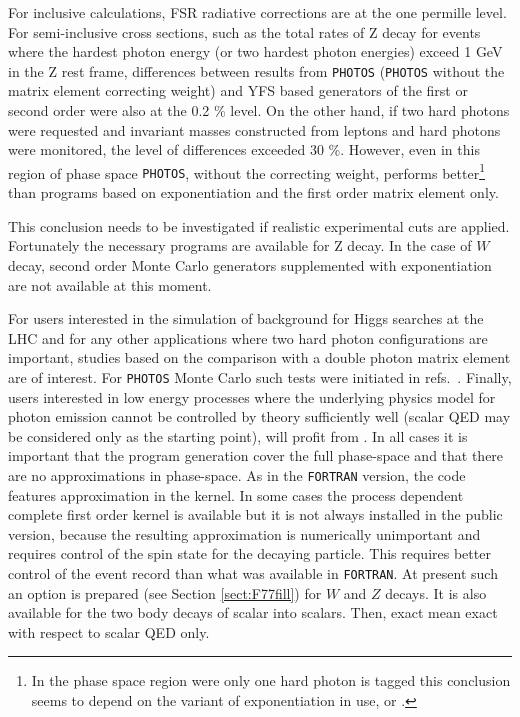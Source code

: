 \documentclass[]{Photos_interface_design}
\begin{document}
For inclusive calculations, FSR radiative corrections are at the one permille level.
For semi-inclusive cross sections, such as the total rates of Z decay for events
where the hardest photon energy (or two hardest photon energies)   exceed 1 GeV in the Z rest frame, differences
between results from {\tt PHOTOS} ({\tt PHOTOS}  without the matrix element correcting weight)
and YFS based generators of the first or second order were also 
at the 0.2 \% level. 
On the other hand, if two  hard photons were requested and invariant masses constructed from leptons
and hard photons were monitored,
 the level of differences exceeded 
 30 \%. However, even in this region of phase space {\tt PHOTOS},  without the correcting
weight, performs better\footnote{In 
  the phase space region were only one hard photon is tagged this conclusion seems to depend
  on the variant of exponentiation in use, \cite{koralz4:1994} or \cite{kkcpc:1999}.
                                }
than programs based on exponentiation and the first order matrix element only. 

This conclusion needs to be investigated if   
realistic experimental 
cuts are applied. Fortunately the necessary programs are available for Z decay.
In the case of $W$ decay, second order Monte Carlo generators supplemented with 
exponentiation are not available at this moment.
 
For users interested in the simulation of
background for Higgs searches at the LHC and for any other applications where 
two hard photon configurations are important, studies based on the comparison with 
a double photon matrix element are of 
interest. For {\tt PHOTOS} Monte Carlo such tests were initiated 
in refs.~\cite{Barberio:1993qi,RichterWas:1994ep,RichterWas:1993ta}.
Finally, users interested in low energy processes where the underlying physics model 
for photon emission cannot be controlled by theory sufficiently well
(scalar QED may 
be considered only as the starting point), will profit 
from \cite{Nanava:2006vv,Nanava:2009vg}. In all cases it is important that
the  program generation cover the full phase-space and that there are no 
approximations in phase-space. As in the {\tt FORTRAN} version, the code 
features approximation in the kernel. In some cases the process dependent 
complete first order 
kernel is available but it is not always installed in the public version,  
because the resulting approximation is 
numerically unimportant and requires control of the spin state for the decaying 
particle. This requires better control of the event record than what was available 
in {\tt FORTRAN}. At present such an option is prepared (see Section \ref{sect:F77fill}) for $W$ and $Z$ decays. It is also available for the two body decays of scalar into scalars. Then, exact mean exact with respect to scalar QED only. 
\end{document}
